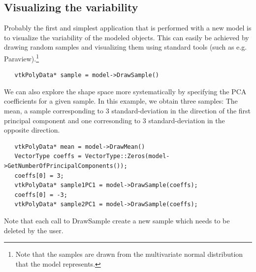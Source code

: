 \documentclass{InsightArticle}
\begin{document}
\subsection{Visualizing the variability} \label{sec:visvariability}
Probably the first and simplest application that is performed with a new model is to visualize the variability of the modeled objects. 
This can easily be achieved by drawing random samples and visualizing them using standard tools (such as e.g. Paraview).\footnote{Note that the samples are drawn from the multivariate normal distribution that the model represents.} 
\begin{verbatim}
   vtkPolyData* sample = model->DrawSample()
\end{verbatim}
We can also explore the shape space more systematically by specifying
the PCA coefficients for a given sample. In this example, we obtain three samples:
The mean, a sample corresponding to 3 standard-deviation in the direction of the
first principal component and one corresonding to 3 standard-deviation in the opposite direction.
\begin{verbatim}
   vtkPolyData* mean = model->DrawMean()
   VectorType coeffs = VectorType::Zeros(model->GetNumberOfPrincipalComponents());
   coeffs[0] = 3;
   vtkPolyData* sample1PC1 = model->DrawSample(coeffs);
   coeffs[0] = -3;
   vtkPolyData* sample2PC1 = model->DrawSample(coeffs);
\end{verbatim}
Note that each call to DrawSample create a new sample which needs to be deleted by the user.
\end{document}
